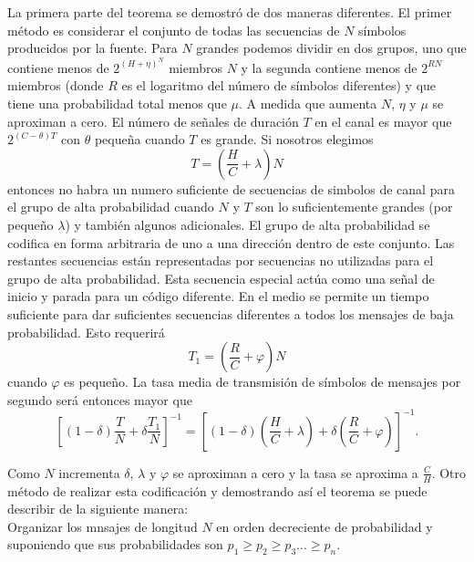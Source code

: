 La primera parte del teorema se demostr\'o de dos maneras diferentes.
El primer m\'etodo es considerar el conjunto de todas las secuencias
de $N$ s\'imbolos producidos por la fuente. Para $N$ grandes podemos
dividir en dos grupos, uno que contiene menos de $2^{(H+\eta)^{N}}$
miembros $N$ y la segunda contiene menos de $2^{RN}$ miembros (donde
$R$ es el logaritmo del n\'umero de s\'imbolos diferentes) y que tiene
una probabilidad total menos que $\mu$. A medida que aumenta $N$,
$\eta$ y $\mu$ se aproximan a cero. El n\'umero de se\~{n}ales de
duraci\'on $T$ en el canal es mayor que $2^{(C-\theta)T}$ con $\theta$
peque\~{n}a cuando $T$ es grande. Si nosotros elegimos
\begin{equation}
T =(\frac{H}{C}+\lambda)N
\end{equation}
entonces no habra un numero suficiente de secuencias de simbolos de
canal para el grupo de alta probabilidad cuando $N$ y $T$ son lo
suficientemente grandes (por peque\~{n}o $\lambda$) y tambi\'en
algunos adicionales. El grupo de alta probabilidad se codifica en
forma arbitraria de uno a una direcci\'on dentro de este conjunto. Las
restantes secuencias est\'an representadas por secuencias no
utilizadas para el grupo de alta probabilidad. Esta secuencia especial
act\'ua como una se\~{n}al de inicio y parada para un c\'odigo
diferente. En el medio se permite un tiempo suficiente para dar
suficientes secuencias diferentes a todos los mensajes de baja
probabilidad. Esto requerir\'a
\begin{equation}
T_{1} = \left(\frac{R}{C} + \varphi\right)N
\end{equation}
cuando $\varphi$ es peque\~{n}o. La tasa media de transmisi\'on de s\'imbolos de mensajes por segundo ser\'a entonces 
mayor que
\begin{equation}
\left[(1-\delta)\frac{T}{N} + \delta\frac{T_{1}}{N}\right]^{-1} 
= 
\left[(1-\delta) 
\left(\frac{H}{C} + \lambda \right) + 
\delta \left(\frac{R}{C} + \varphi \right) \right]^{-1}.
\end{equation}

Como $N$ incrementa $\delta$, $\lambda$ y $\varphi$ se aproximan a cero y la tasa se aproxima a  $\frac{C}{H}$.
Otro m\'etodo de realizar esta codificaci\'on y demostrando as\'i el teorema se puede describir de la siguiente manera:\\
Organizar los mnsajes de longitud $N$ en orden decreciente de probabilidad y suponiendo que sus probabilidades 
son $p_{1}\geq p_{2}\geq p_{3} \ldots \geq p_{n}$.

